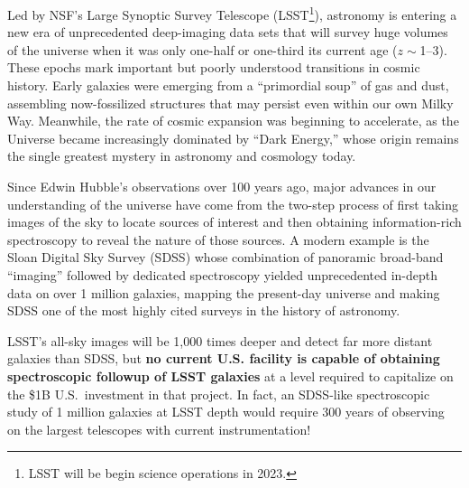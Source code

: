 \documentclass[oneside,11pt]{amsart}
\begin{document}


Led by NSF's Large Synoptic Survey Telescope (LSST\footnote{LSST will be begin science operations in 2023.}), astronomy is entering a new era of unprecedented deep-imaging data
sets that will survey huge volumes of the universe when it was only one-half or one-third its current age ($z \sim
$1--3).  These epochs mark important but poorly understood transitions in cosmic history. Early galaxies were emerging
from a ``primordial soup'' of gas and dust, assembling now-fossilized structures that may persist even within our
own Milky Way.  Meanwhile, the rate of cosmic expansion was beginning to accelerate, as the Universe became
increasingly dominated by ``Dark Energy,'' whose origin remains the single greatest mystery in astronomy and cosmology
today.

Since Edwin Hubble's observations over 100 years ago, major advances in our understanding of the universe have come
from the two-step process of first taking images of the sky to locate sources of interest and then obtaining
information-rich spectroscopy to reveal the nature of those sources.  A modern example is the Sloan Digital Sky Survey
(SDSS) whose combination of panoramic broad-band ``imaging'' followed by dedicated spectroscopy yielded 
unprecedented in-depth data on over 1 million galaxies, mapping the present-day universe and making SDSS one of the most
highly cited surveys in the history of astronomy.


LSST's all-sky images will be 1,000 times deeper and detect far more distant galaxies than SDSS, but \textbf{no current
U.S. facility is capable of obtaining spectroscopic followup of LSST galaxies} at a level required to capitalize on the \$1B U.S.\
investment in that project.  In fact, an SDSS-like spectroscopic study of 1 million galaxies at LSST depth would require 300 years of observing on the largest telescopes with current instrumentation!  
\end{document}
